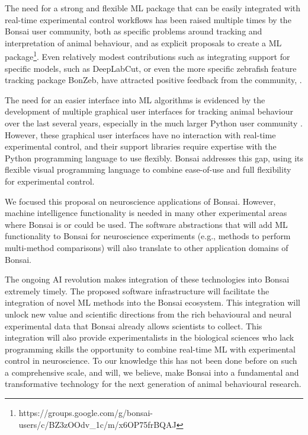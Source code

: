 The need for a strong and
flexible ML package that can be easily integrated with
real-time experimental control workflows has been raised multiple times by the
Bonsai user community, both as specific problems around 
tracking and interpretation of animal behaviour, and as 
explicit proposals to create a ML
package\footnote{https://groups.google.com/g/bonsai-users/c/BZ3zOOdv\_1c/m/x6OP75frBQAJ}. Even
relatively modest contributions such as integrating support for specific models, such as DeepLabCut, or even the more specific zebrafish feature
tracking package BonZeb, have attracted positive
feedback from the community, \citep[e.g.,][]{kaneEtAl20,guilbeaultEtAl21}.

The need for an easier interface into ML algorithms
is evidenced by the development of multiple graphical user interfaces for
tracking animal behaviour over the last several years, especially in the much
larger Python user community
\citep[e.g.,][]{walterAndCouzin21,guilbeaultEtAl21}. However, these graphical
user interfaces have no interaction with real-time experimental control, and
their support libraries require expertise with the Python programming language
to use flexibly. Bonsai addresses this gap, using its
flexible visual programming language to combine ease-of-use and full
flexibility for experimental control.

We focused this proposal on neuroscience applications of Bonsai. However, machine intelligence functionality is needed in many other
experimental areas where Bonsai is or could be used. The software
abstractions that will add ML
functionality to Bonsai for neuroscience experiments (e.g., methods to perform
multi-method comparisons) will also translate to other application domains of
Bonsai.

The ongoing AI revolution makes integration of these
technologies into Bonsai extremely timely. The proposed software infrastructure will facilitate the integration of novel ML methods into the Bonsai
ecosystem. This integration will unlock new value
and scientific directions from the rich behavioural and neural
experimental data that Bonsai already allows scientists to collect. This
integration will also provide experimentalists in the biological
sciences who lack programming skills the opportunity to combine real-time ML with
experimental control in neuroscience. To our knowledge
this has not been done before on such a comprehensive scale, and will, we believe, make Bonsai into a fundamental and transformative technology for
the next generation of animal behavioural research.


